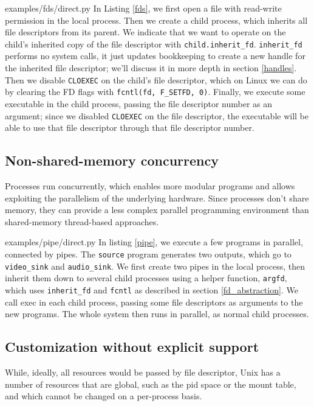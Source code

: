 \documentclass[letterpaper,twocolumn,10pt]{article}
\begin{document}

{examples/fds/direct.py}
In Listing \ref{fds},
we first open a file with read-write permission in the local process.
Then we create a child process,
which inherits all file descriptors from its parent.
We indicate that we want to operate on the child's inherited copy of the file descriptor with \verb|child.inherit_fd|.
\texttt{inherit\_fd} performs no system calls,
it just updates bookkeeping to create a new handle for the inherited file descriptor;
we'll discuss it in more depth in section \ref{handles}.
Then we disable \texttt{CLOEXEC} on the child's file descriptor,
which on Linux we can do by clearing the FD flags with \verb|fcntl(fd, F_SETFD, 0)|.
Finally, we execute some executable in the child process,
passing the file descriptor number as an argument;
since we disabled \texttt{CLOEXEC} on the file descriptor,
the executable will be able to use that file descriptor through that file descriptor number.
\subsection{Non-shared-memory concurrency}
Processes run concurrently,
which enables more modular programs
and allows exploiting the parallelism of the underlying hardware.
Since processes don't share memory,
they can provide a less complex parallel programming environment
than shared-memory thread-based approaches.\cite{threads}


{examples/pipe/direct.py}
In listing \ref{pipe},
we execute a few programs in parallel,
connected by pipes.
The \texttt{source} program generates two outputs, which go to \texttt{video\_sink} and \texttt{audio\_sink}.
We first create two pipes in the local process,
then inherit them down to several child processes using a helper function, \verb|argfd|,
which uses \verb|inherit_fd| and \texttt{fcntl} as described in section \ref{fd_abstraction}.
We call exec in each child process, passing some file descriptors as arguments to the new programs.
The whole system then runs in parallel,
as normal child processes.
\subsection{Customization without explicit support}
While, ideally, all resources would be passed by file descriptor,
Unix has a number of resources that are global,
such as the pid space or the mount table,
and which cannot be changed on a per-process basis.\cite{capsicum}
\end{document}
